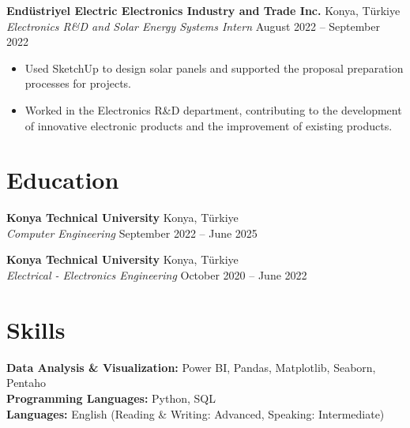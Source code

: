 \documentclass[10pt,a4paper]{extarticle}
\begin{document}
\textbf{Endüstriyel Electric Electronics Industry and Trade Inc.} \hfill Konya, Türkiye\\
\textit{Electronics R\&D and Solar Energy Systems Intern} \hfill August 2022 -- September 2022
\begin{itemize}[leftmargin=*,noitemsep,topsep=0pt]
    \item Used SketchUp to design solar panels and supported the proposal preparation processes for projects.
    \item Worked in the Electronics R\&D department, contributing to the development of innovative electronic products and the improvement of existing products.
\end{itemize}

\section{Education}
\textbf{Konya Technical University} \hfill Konya, Türkiye\\
\textit{Computer Engineering} \hfill September 2022 -- June 2025

\textbf{Konya Technical University} \hfill Konya, Türkiye\\
\textit{Electrical - Electronics Engineering} \hfill October 2020 -- June 2022

\section{Skills}
\textbf{Data Analysis \& Visualization:} Power BI, Pandas, Matplotlib, Seaborn, Pentaho\\
\textbf{Programming Languages:} Python, SQL\\
\textbf{Languages:} English (Reading \& Writing: Advanced, Speaking: Intermediate)
\end{document}
